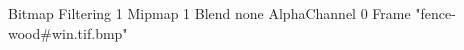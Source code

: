 {Bitmap
	{Filtering 1}
	{Mipmap 1}
	{Blend none}
	{AlphaChannel 0}
	{Frame "fence-wood#win.tif.bmp"}
}
